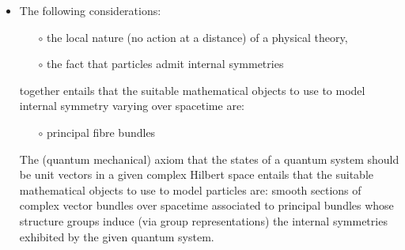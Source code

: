\begin{itemize}
\item
	The following considerations:
	\begin{itemize}
	\item[$\circ$]
		the local nature (no action at a distance) of a physical theory,
	\item[$\circ$]
		the fact that particles admit internal symmetries
	\end{itemize}
	together entails that the suitable mathematical objects to use to model
	internal symmetry varying over spacetime are:
	\begin{itemize}
	\item[$\circ$]
		principal fibre bundles
	\end{itemize}
	The (quantum mechanical) axiom that the states of a quantum system should be
	unit vectors in a given complex Hilbert space entails that the suitable mathematical
	objects to use to model particles are: smooth sections of complex vector bundles
	over spacetime associated to principal bundles whose structure groups induce
	(via group representations) the internal symmetries exhibited by the given quantum system.
\end{itemize}


